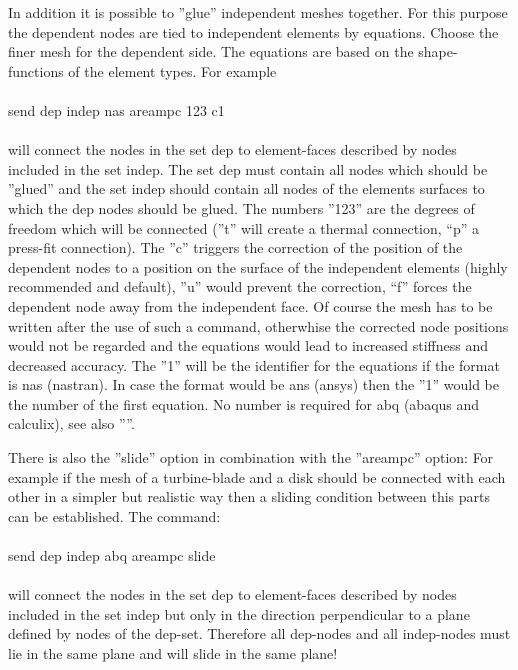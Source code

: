\documentclass{article}
\begin{document}
In addition it is possible to ''glue'' independent meshes together. For this purpose the dependent nodes are tied to independent elements by equations. Choose the finer mesh for the dependent side. The equations are based on the shape-functions of the element types. For example\\\\send dep indep nas areampc 123 c1\\\\will connect the nodes in the set dep to element-faces described by nodes included in the set indep. The set dep must contain all nodes which should be ''glued'' and the set indep should contain all nodes of the elements surfaces to which the dep nodes should be glued. The numbers ''123'' are the degrees of freedom which will be connected (''t'' will create a thermal connection, ``p'' a press-fit connection). The ''c'' triggers the correction of the position of the dependent nodes to a position on the surface of the independent elements (highly recommended and default), ''u'' would prevent the correction, ``f'' forces the dependent node away from the independent face. Of course the mesh has to be written after the use of such a command, otherwhise the corrected node positions would not be regarded and the equations would lead to increased stiffness and decreased accuracy. The ''1'' will be the identifier for the equations if the format is nas (nastran). In case the format would be ans (ansys) then the ''1'' would be the number of the first equation. No number is required for abq (abaqus and calculix), see also ''''.

There is also the ''slide'' option in combination with the ''areampc'' option: For example if the mesh of a turbine-blade and a disk should be connected with each other in a simpler but realistic way then a sliding condition between this parts can be established. The command:\\\\send dep indep abq areampc slide\\\\will connect the nodes in the set dep to element-faces described by nodes included in the set indep but only in the direction perpendicular to a plane defined by nodes of the dep-set. Therefore all dep-nodes and all indep-nodes must lie in the same plane and will slide in the same plane!\\
\end{document}
